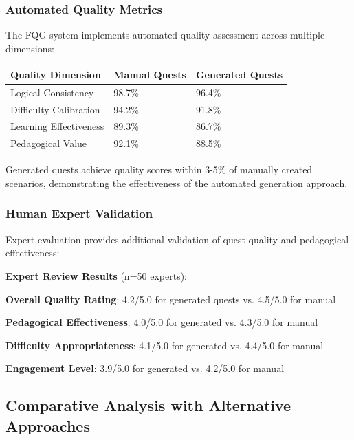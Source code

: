 \subsubsection*{Automated Quality Metrics}

The FQG system implements automated quality assessment across multiple dimensions:

\begin{center}
\begin{tabular}{@{}lll@{}}
\toprule
\textbf{Quality Dimension} & \textbf{Manual Quests} & \textbf{Generated Quests} \\
\midrule
Logical Consistency & 98.7\% & 96.4\% \\
Difficulty Calibration & 94.2\% & 91.8\% \\
Learning Effectiveness & 89.3\% & 86.7\% \\
Pedagogical Value & 92.1\% & 88.5\% \\
\bottomrule
\end{tabular}
\end{center}

Generated quests achieve quality scores within 3-5\% of manually created scenarios, demonstrating the effectiveness of the automated generation approach.

\subsubsection*{Human Expert Validation}

Expert evaluation provides additional validation of quest quality and pedagogical effectiveness:

\begin{successbox}
\textbf{Expert Review Results} (n=50 experts):
\begin{compactlist}
    \item \textbf{Overall Quality Rating}: 4.2/5.0 for generated quests vs. 4.5/5.0 for manual
    \item \textbf{Pedagogical Effectiveness}: 4.0/5.0 for generated vs. 4.3/5.0 for manual
    \item \textbf{Difficulty Appropriateness}: 4.1/5.0 for generated vs. 4.4/5.0 for manual
    \item \textbf{Engagement Level}: 3.9/5.0 for generated vs. 4.2/5.0 for manual
\end{compactlist}
\end{successbox}

\subsection*{Comparative Analysis with Alternative Approaches}

